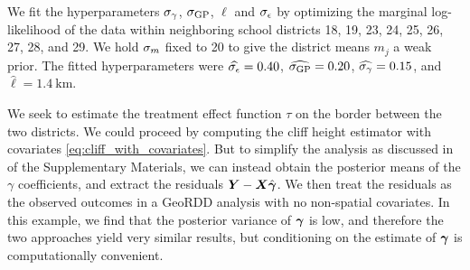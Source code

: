 We fit the hyperparameters \(\sigma_{\gamma}\), \(\sigma_{\mathrm{GP}}\), \(\ell\) and \(\sigma_{\epsilon}\) by optimizing the marginal log-likelihood of the data within neighboring school districts 18, 19, 23, 24, 25, 26, 27, 28, and 29.
We hold \(\sigma_{m}\) fixed to 20 to give the district means \(m_j\) a weak prior.
The fitted hyperparameters were \(\widehat{\sigma_{\epsilon}}=0.40\), \(\widehat{\sigma_{\mathrm{GP}}}=0.20\), \(\widehat{\sigma_{\gamma}}=0.15\), and \(\widehat{\ell}=1.4~\text{km}\).

We seek to estimate the treatment effect function \(\tau\) on the border between the two districts.
We could proceed by computing the cliff height estimator with covariates \autoref{eq:cliff_with_covariates}.
But to simplify the analysis as discussed in  of the Supplementary Materials, we can instead obtain the posterior means of the \(\gamma\) coefficients, and extract the residuals \(\bm{Y}{}-\bm{X} \hat{\bm{\gamma}}\).
We then treat the residuals as the observed outcomes in a GeoRDD analysis with no non-spatial covariates.
In this example, we find that the posterior variance of \(\bm{\gamma}\) is low, and therefore the two approaches yield very similar results, but conditioning on the estimate of \(\bm{\gamma}\) is computationally convenient.

